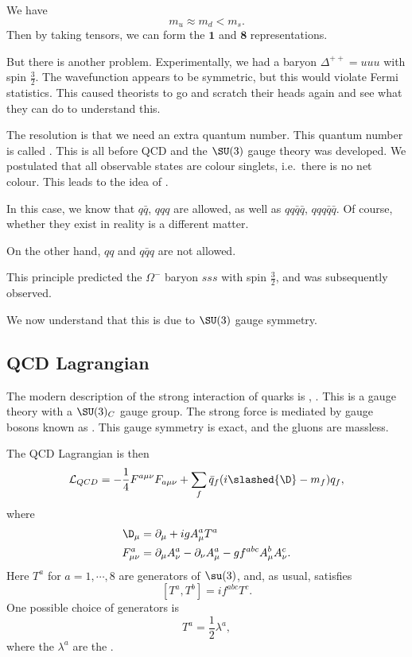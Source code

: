 \documentclass[a4paper]{article}
\begin{document}
We have
\[
  m_u \approx m_d < m_s.
\]
Then by taking tensors, we can form the $\mathbf{1}$ and $\mathbf{8}$ representations.

But there is another problem. Experimentally, we had a baryon $\Delta^{++} = uuu$ with spin $\frac{3}{2}$. The wavefunction appears to be symmetric, but this would violate Fermi statistics. This caused theorists to go and scratch their heads again and see what they can do to understand this.

The resolution is that we need an extra quantum number. This quantum number is called . This is all before QCD and the $\SU(3)$ gauge theory was developed. We postulated that all observable states are colour singlets, i.e.\ there is no net colour. This leads to the idea of .

In this case, we know that $q\bar{q}$, $qqq$ are allowed, as well as $qq\bar{q}\bar{q}$, $qqq\bar{q}\bar{q}$. Of course, whether they exist in reality is a different matter.

On the other hand, $qq$ and $q \bar{q} q$ are not allowed.

This principle predicted the $\Omega^-$ baryon $sss$ with spin $\frac{3}{2}$, and was subsequently observed.

We now understand that this is due to $\SU(3)$ gauge symmetry.

\subsection{QCD Lagrangian}
The modern description of the strong interaction of quarks is , . This is a gauge theory with a $\SU(3)_C$ gauge group. The strong force is mediated by gauge bosons known as . This gauge symmetry is exact, and the gluons are massless.

The QCD Lagrangian is then
\[
  \mathcal{L}_{QCD} = -\frac{1}{4} F^{a\mu\nu} F_{a\mu\nu} + \sum_f \bar{q}_f (i \slashed{\D} - m_f) q_f,
\]
where
\begin{align*}
  \D_\mu &= \partial_\mu + i g A_\mu^a T^a\\
  F_{\mu\nu}^a &= \partial_\mu A_\nu^a - \partial_\nu A_\mu^a - g f^{abc} A_\mu^b A_\nu^c.
\end{align*}
Here $T^a$ for $a = 1, \cdots, 8$ are generators of $\su(3)$, and, as usual, satisfies
\[
  [T^a, T^b] = i f^{abc}T^c.
\]
One possible choice of generators is
\[
  T^a = \frac{1}{2} \lambda^a,
\]
where the $\lambda^a$ are the .
\end{document}
